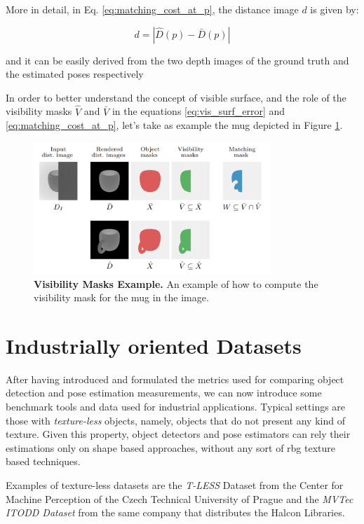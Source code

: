 More in detail, in Eq. \ref{eq:matching_cost_at_p}, the distance image $d$ is given by:

\begin{equation}
    \label{eq:distance_image}
    d = |\hat{D}(p) - \bar{D}(p)|
\end{equation}

and it can be easily derived from the two depth images of the ground truth and the estimated poses respectively

In order to better understand the concept of visible surface, and the role of the visibility masks $\hat{V}$ and $\bar{V}$ in the equations \ref{eq:vis_surf_error} and \ref{eq:matching_cost_at_p}, let's take as example the mug depicted in Figure \ref{fig:visibility_mask_ex}.

\begin{figure}
    \centering
    \includegraphics[width=0.8\textwidth]{figures/2_benchmarks_and_metrics/visibility_mask_ex}
    \caption{\textbf{Visibility Masks Example.} An example of how to compute the visibility mask for the mug in the image.}
    \label{fig:visibility_mask_ex}
\end{figure}

\section{Industrially oriented Datasets}\label{sec:datasets}
After having introduced and formulated the metrics used for comparing object detection and pose estimation measurements, we can now introduce some benchmark tools and data used for industrial applications. Typical settings are those with \emph{texture-less} objects, namely, objects that do not present any kind of texture. Given this property, object detectors and pose estimators can rely their estimations only on shape based approaches, without any sort of rbg texture based techniques.

Examples of texture-less datasets are the \emph{T-LESS} Dataset \cite{hodan2017tless} from the Center for Machine Perception of the Czech Technical University of Prague and the \emph{MVTec ITODD Dataset} \cite{mvtec2017itodd} from the same company that distributes the Halcon Libraries.

